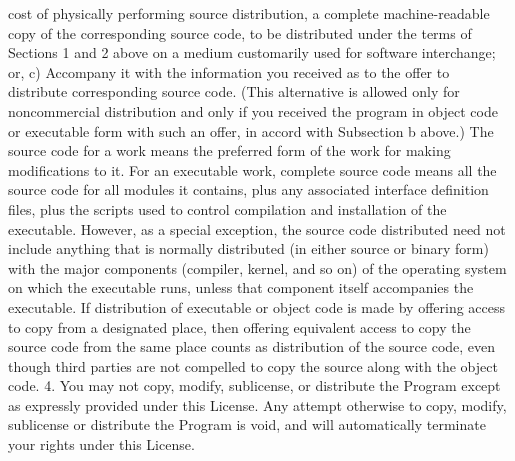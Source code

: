 \begin{DoxyCodeInclude}
\textcolor{stringliteral}{    cost of physically performing source distribution, a complete}
\textcolor{stringliteral}{    machine-readable copy of the corresponding source code, to be}
\textcolor{stringliteral}{    distributed under the terms of Sections 1 and 2 above on a medium}
\textcolor{stringliteral}{    customarily used for software interchange; or,}
\textcolor{stringliteral}{}
\textcolor{stringliteral}{    c) Accompany it with the information you received as to the offer}
\textcolor{stringliteral}{    to distribute corresponding source code.  (This alternative is}
\textcolor{stringliteral}{    allowed only for noncommercial distribution and only if you}
\textcolor{stringliteral}{    received the program in object code or executable form with such}
\textcolor{stringliteral}{    an offer, in accord with Subsection b above.)}
\textcolor{stringliteral}{}
\textcolor{stringliteral}{The source code for a work means the preferred form of the work for}
\textcolor{stringliteral}{making modifications to it.  For an executable work, complete source}
\textcolor{stringliteral}{code means all the source code for all modules it contains, plus any}
\textcolor{stringliteral}{associated interface definition files, plus the scripts used to}
\textcolor{stringliteral}{control compilation and installation of the executable.  However, as a}
\textcolor{stringliteral}{special exception, the source code distributed need not include}
\textcolor{stringliteral}{anything that is normally distributed (in either source or binary}
\textcolor{stringliteral}{form) with the major components (compiler, kernel, and so on) of the}
\textcolor{stringliteral}{operating system on which the executable runs, unless that component}
\textcolor{stringliteral}{itself accompanies the executable.}
\textcolor{stringliteral}{}
\textcolor{stringliteral}{If distribution of executable or object code is made by offering}
\textcolor{stringliteral}{access to copy from a designated place, then offering equivalent}
\textcolor{stringliteral}{access to copy the source code from the same place counts as}
\textcolor{stringliteral}{distribution of the source code, even though third parties are not}
\textcolor{stringliteral}{compelled to copy the source along with the object code.}
\textcolor{stringliteral}{}
\textcolor{stringliteral}{  4. You may not copy, modify, sublicense, or distribute the Program}
\textcolor{stringliteral}{except as expressly provided under this License.  Any attempt}
\textcolor{stringliteral}{otherwise to copy, modify, sublicense or distribute the Program is}
\textcolor{stringliteral}{void, and will automatically terminate your rights under this License.}

\end{DoxyCodeInclude}
